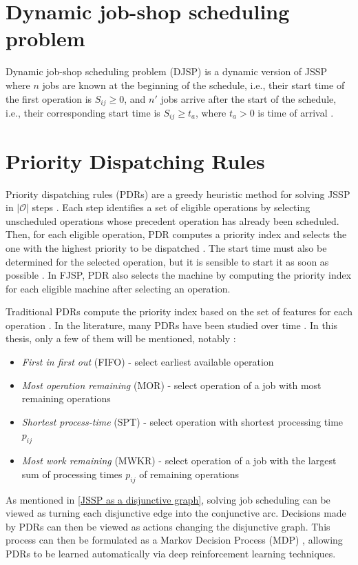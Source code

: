 \section{Dynamic job-shop scheduling problem}

Dynamic job-shop scheduling problem (DJSP) is a dynamic version of JSSP where $n$ jobs are known at the beginning of the schedule, i.e., their start time of the first operation is $S_{ij} \geq 0$, and $n'$ jobs arrive after the start of the schedule, i.e., their corresponding start time is $S_{ij} \geq t_a$, where $t_a > 0$ is time of arrival \cite{KUNDAKCI201631, Haupt_1989a}.

\section{Priority Dispatching Rules}
Priority dispatching rules (PDRs) are a greedy heuristic method for solving JSSP in $\left|\mathcal{O}\right|$ steps \cite{zhang2020learning}. Each step identifies a set of eligible operations by selecting unscheduled operations whose precedent operation has already been scheduled. Then, for each eligible operation, PDR computes a priority index and selects the one with the highest priority to be dispatched \cite{zhang2020learning}. The start time must also be determined for the selected operation, but it is sensible to start it as soon as possible \cite{discovering_dispatching_rules}. In FJSP, PDR also selects the machine by computing the priority index for each eligible machine after selecting an operation.
\par
Traditional PDRs compute the priority index based on the set of features for each operation \cite{Haupt_1989a}. In the literature, many PDRs have been studied over time \cite{7232991, discovering_dispatching_rules, doi:10.1080/00207543.2011.611539, Haupt_1989a}. In this thesis, only a few of them will be mentioned, notably \cite{Haupt_1989a, 10226873}:
\begin{itemize}
    \item \textit{First in first out} (FIFO) - select earliest available operation 
    \item \textit{Most operation remaining} (MOR) - select operation of a job with most remaining operations
    \item \textit{Shortest process-time} (SPT) - select operation with shortest processing time $p_{ij}$
    \item \textit{Most work remaining} (MWKR) - select operation of a job with the largest sum of processing times $p_{ij}$ of remaining operations
\end{itemize}
As mentioned in \ref{JSSP as a disjunctive graph}, solving job scheduling can be viewed as turning each disjunctive edge into the conjunctive arc. Decisions made by PDRs can then be viewed as actions changing the disjunctive graph. This process can then be formulated as a Markov Decision Process (MDP) \cite{zhang2020learning, jssp_rl_env}, allowing PDRs to be learned automatically via deep reinforcement learning techniques.

